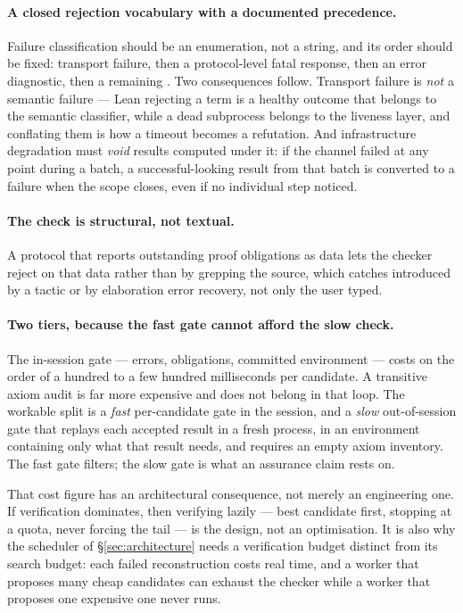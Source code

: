 \paragraph{A closed rejection vocabulary with a documented precedence.}
Failure classification should be an enumeration, not a string, and its order
should be fixed: transport failure, then a protocol-level fatal response, then
an error diagnostic, then a remaining . Two consequences follow.
Transport failure is \emph{not} a semantic failure --- Lean rejecting a term is
a healthy outcome that belongs to the semantic classifier, while a dead
subprocess belongs to the liveness layer, and conflating them is how a timeout
becomes a refutation. And infrastructure degradation must \emph{void} results
computed under it: if the channel failed at any point during a batch, a
successful-looking result from that batch is converted to a failure when the
scope closes, even if no individual step noticed.

\paragraph{The  check is structural, not textual.}
A protocol that reports outstanding proof obligations as data lets the checker
reject on that data rather than by grepping the source, which catches
 introduced by a tactic or by elaboration error recovery, not only
 the user typed.

\paragraph{Two tiers, because the fast gate cannot afford the slow check.}
The in-session gate --- errors, obligations, committed environment --- costs on
the order of a hundred to a few hundred milliseconds per candidate. A
transitive axiom audit is far more expensive and does not belong in that loop.
The workable split is a \emph{fast} per-candidate gate in the session, and a
\emph{slow} out-of-session gate that replays each accepted result in a fresh
process, in an environment containing only what that result needs, and requires
an empty axiom inventory. The fast gate filters; the slow gate is what an
assurance claim rests on.

That cost figure has an architectural consequence, not merely an engineering
one. If verification dominates, then verifying lazily --- best candidate first,
stopping at a quota, never forcing the tail --- is the design, not an
optimisation. It is also why the scheduler of \S\ref{sec:architecture} needs a
verification budget distinct from its search budget: each failed reconstruction
costs real time, and a worker that proposes many cheap candidates can exhaust
the checker while a worker that proposes one expensive one never runs.

